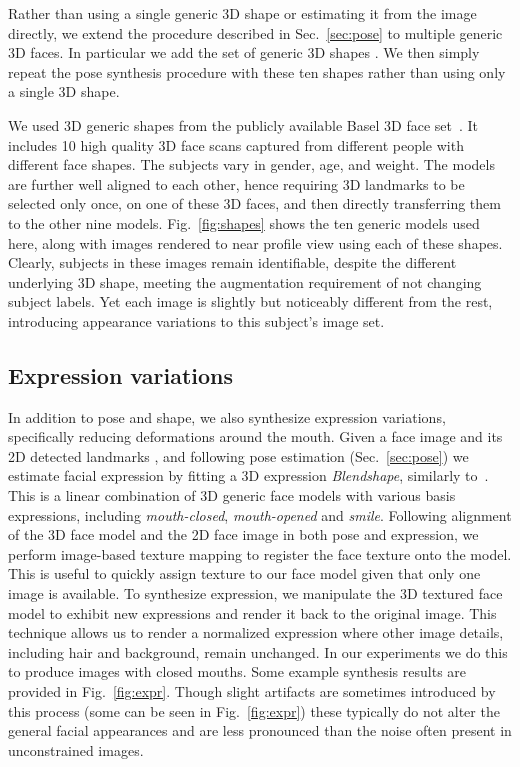 \documentclass[runningheads]{llncs}
\begin{document}
Rather than using a single generic 3D shape or estimating it from the image directly, we extend the procedure described in Sec.~\ref{sec:pose} to multiple generic 3D faces. In particular we add the set of generic 3D shapes . We then simply repeat the pose synthesis procedure with these ten shapes rather than using only a single 3D shape. 

We used 3D generic shapes from the publicly available Basel 3D face set~\cite{bfm2009}. It includes 10 high quality 3D face scans captured from different people with different face shapes. The subjects vary in gender, age, and weight. The models are further well aligned to each other, hence requiring 3D landmarks to be selected only once, on one of these 3D faces, and then directly transferring them to the other nine models. Fig.~\ref{fig:shapes} shows the ten generic models used here, along with images rendered to near profile view using each of these shapes. Clearly, subjects in these images remain identifiable, despite the different underlying 3D shape, meeting the augmentation requirement of not changing subject labels. Yet each image is slightly but noticeably different from the rest, introducing  appearance variations to this subject's image set.


\subsection{Expression variations}\label{sec:expressions}
In addition to pose and shape, we also synthesize expression variations, specifically reducing deformations around the mouth. Given a face image  and its 2D detected landmarks , and following pose estimation (Sec.~\ref{sec:pose}) we estimate facial expression by fitting a 3D expression {\em Blendshape}, similarly to~\cite{blendshapes}. 
This  is a linear combination of 3D generic face models with various basis expressions, including {\em mouth-closed}, {\em mouth-opened} and {\em smile}. 
Following alignment of the 3D face model and the 2D face image in both pose and expression, we perform image-based texture mapping to register the face texture onto the model. This is useful to quickly assign texture to our face model given that only one image is available. To synthesize expression, we manipulate the 3D textured face model to exhibit new expressions and render it back to the original image. This technique allows us to render a normalized expression where other image details, including hair and background, remain unchanged. In our experiments we do this to produce images with closed mouths. Some example synthesis results are provided in Fig.~\ref{fig:expr}. Though slight artifacts are sometimes introduced by this process (some can be seen in Fig.~\ref{fig:expr}) these typically do not alter the general facial appearances and are less pronounced than the noise often present in unconstrained images.
\end{document}
